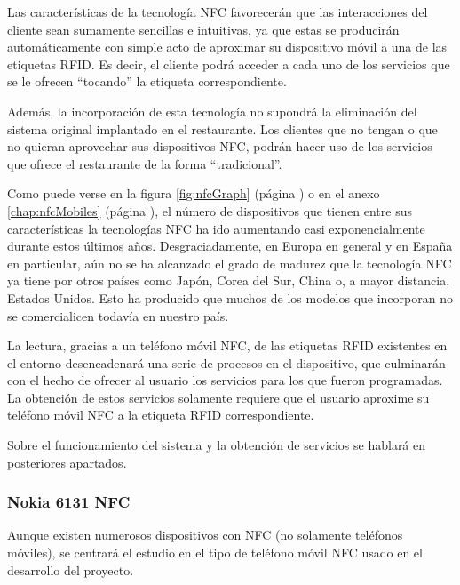 Las características de la tecnología \acs{NFC} favorecerán que las 
interacciones del cliente sean sumamente sencillas e intuitivas, ya que estas 
se producirán automáticamente con simple acto de aproximar su dispositivo 
móvil a una de las etiquetas \acs{RFID}. Es decir, el cliente podrá acceder
a cada uno de los servicios que se le ofrecen ``tocando'' la etiqueta
correspondiente.

Además, la incorporación de esta tecnología no supondrá la eliminación del
sistema original implantado en el restaurante. Los clientes que no tengan
o que no quieran aprovechar sus dispositivos \acs{NFC}, podrán hacer uso de
los servicios que ofrece el restaurante de la forma ``tradicional''.

Como puede verse en la figura \ref{fig:nfcGraph} (página
\pageref{fig:nfcGraph}) o en el anexo \ref{chap:nfcMobiles} (página
\pageref{chap:nfcMobiles}), el número de dispositivos que tienen entre sus 
características la tecnologías \acs{NFC} ha ido aumentando casi 
exponencialmente durante estos últimos años. Desgraciadamente, en Europa
en general y en España en particular, aún no se ha alcanzado el grado de
madurez que la tecnología \acs{NFC} ya tiene por otros países como Japón,
Corea del Sur, China o, a mayor distancia, Estados Unidos. Esto ha producido
que muchos de los modelos que incorporan  no se comercialicen
todavía en nuestro país.







La lectura, gracias a un teléfono móvil NFC, de las etiquetas RFID existentes 
en el entorno desencadenará una serie de procesos en el dispositivo, que 
culminarán con el hecho de ofrecer al usuario los servicios para los que fueron 
programadas. La obtención de estos servicios solamente requiere que el usuario 
aproxime su teléfono móvil NFC a la etiqueta RFID correspondiente. 

Sobre el funcionamiento del sistema y la obtención de servicios se hablará en
posteriores apartados.

    \subsubsection{Nokia 6131 \acs{NFC}}
Aunque existen numerosos dispositivos con NFC (no solamente teléfonos móviles),
se centrará el estudio en el tipo de teléfono móvil NFC usado en el desarrollo 
del proyecto.

